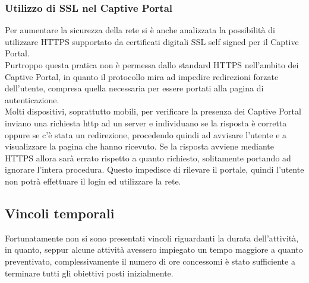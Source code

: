 \documentclass[Tesi.tex]{subfiles}
\begin{document}
\subsubsection{Utilizzo di SSL nel Captive Portal}
Per aumentare la sicurezza della rete si è anche analizzata la possibilità di utilizzare HTTPS supportato da certificati digitali SSL self signed per il Captive Portal. \\
Purtroppo questa pratica non è permessa dallo standard HTTPS nell'ambito dei Captive Portal, in quanto il protocollo mira ad impedire redirezioni forzate dell'utente, compresa quella necessaria per essere portati alla pagina di autenticazione. \\
Molti dispositivi, soprattutto mobili, per verificare la presenza dei Captive Portal inviano una richiesta http ad un server e individuano se la risposta è corretta oppure se c'è stata un redirezione, procedendo quindi ad avvisare l'utente e a visualizzare la pagina che hanno ricevuto. Se la risposta avviene mediante HTTPS allora sarà errato rispetto a quanto richiesto, solitamente portando ad ignorare l'intera procedura. Questo impedisce di rilevare il portale, quindi l'utente non potrà effettuare il login ed utilizzare la rete.

\subsection{Vincoli temporali}
Fortunatamente non si sono presentati vincoli riguardanti la durata dell'attività, in quanto, seppur alcune attività avessero impiegato un tempo maggiore a quanto preventivato, complessivamente il numero di ore concessomi è stato sufficiente a terminare tutti gli obiettivi posti inizialmente.
\end{document}
